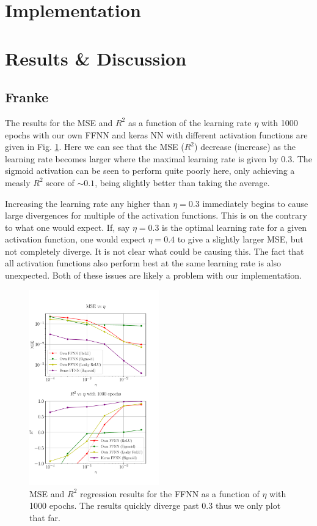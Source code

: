 \documentclass[%
reprint,
amsmath,amssymb,
aps,
]{revtex4-2}
\begin{document}
\section{Implementation}

\section{Results \& Discussion}

\subsection{Franke}
The results for the MSE and $R^2$ as a function of the learning rate $\eta$ with 1000 epochs with our own FFNN and keras NN with different activation functions are given in Fig. \ref{fig:NN_Franke_LR_1000}. Here we can see that the MSE ($R^2$) decrease (increase) as the learning rate becomes larger where the maximal learning rate is given by $0.3$. The sigmoid activation can be seen to perform quite poorly here, only achieving a measly $R^2$ score of $\sim0.1$, being slightly better than taking the average. 

Increasing the learning rate any higher than $\eta=0.3$ immediately begins to cause large divergences for multiple of the activation functions. This is on the contrary to what one would expect. If, say $\eta=0.3$ is the optimal learning rate for a given activation function, one would expect $\eta=0.4$ to give a slightly larger MSE, but not completely diverge. It is not clear what could be causing this. The fact that all activation functions also perform best at the same learning rate is also unexpected. Both of these issues are likely a problem with our implementation.
\begin{figure}
	\includegraphics[width=0.5\textwidth]{Python/Figures/NN_MSE_R2_Franke_LearningRate_Epochs1000.pdf}
	\caption{MSE and $R^2$ regression results for the FFNN as a function of $\eta$ with 1000 epochs. The results quickly diverge past $0.3$ thus we only plot that far.}
	\label{fig:NN_Franke_LR_1000}
\end{figure}
\end{document}
